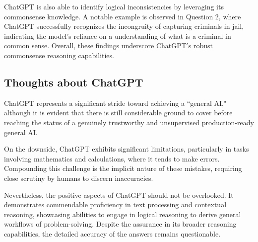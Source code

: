 \documentclass[12pt, a4paper]{article}
\begin{document}
ChatGPT is also able to identify logical inconsistencies by leveraging its commonsense knowledge. A notable example is observed in Question 2, where ChatGPT successfully recognizes the incongruity of capturing criminals in jail, indicating the model's reliance on a understanding of what is a criminal in common sense. Overall, these findings underscore ChatGPT's robust commonsense reasoning capabilities.


\subsection*{Thoughts about ChatGPT}
ChatGPT represents a significant stride toward achieving a ``general AI," although it is evident that there is still considerable ground to cover before reaching the status of a genuinely trustworthy and unsupervised production-ready general AI.

On the downside, ChatGPT exhibits significant limitations, particularly in tasks involving mathematics and calculations, where it tends to make errors. Compounding this challenge is the implicit nature of these mistakes, requiring close scrutiny by humans to discern inaccuracies.

Nevertheless, the positive aspects of ChatGPT should not be overlooked. It demonstrates commendable proficiency in text processing and contextual reasoning, showcasing abilities to engage in logical reasoning to derive general workflows of problem-solving. Despite the assurance in its broader reasoning capabilities, the detailed accuracy of the answers remains questionable.

\newpage
{}
\begin{flushleft}

\end{flushleft}
\end{document}
